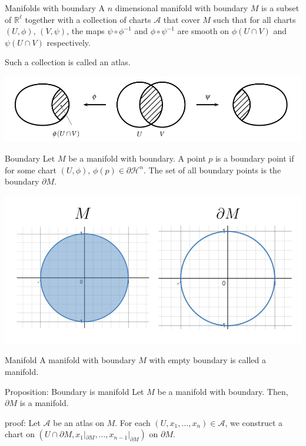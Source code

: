 \documentclass[9pt]{beamer}
\begin{document}
\begin{frame}
    \begin{block}{Manifolds with boundary}
        A $n$ dimensional manifold with boundary $M$ is a subset of $\mathbb{R}^\ell$ together with a collection of charts $\mathcal{A}$ that cover $M$ such that for all charts $(U, \phi)$, $(V, \psi)$, the maps $\psi\circ\phi^{-1}$ and $\phi\circ\psi^{-1}$ are smooth on $\phi(U\cap V)$ and $\psi(U\cap V)$ respectively.

        Such a collection is called an atlas.
    \end{block}
    \includegraphics[scale=0.55]{compatible.PNG}

\end{frame}

\begin{frame}{}
    \begin{block}{Boundary}
        Let $M$ be a manifold with boundary. A point $p$ is a boundary point if for some chart $(U, \phi)$, $\phi(p)\in \partial \mathcal{H}^n$. The set of all boundary points is the boundary $\partial M$.
    \end{block}


\includegraphics[scale=0.6]{boundaryPNG.PNG}

\end{frame}
\begin{frame}
    \begin{block}{Manifold}
        A manifold with boundary $M$ with empty boundary is called a manifold. 
    \end{block}

    \begin{block}{Proposition: Boundary is manifold}
        Let $M$ be a manifold with boundary. Then, $\partial M$ is a manifold.
    \end{block}
    proof: Let $\mathcal{A}$ be an atlas on $M$. For each $(U, x_1, \dots, x_n)\in \mathcal{A}$, we construct a chart on $(U\cap \partial M , x_1|_{\partial M}, \dots, x_{n-1}|_{\partial M})$ on $\partial M$.
\end{frame}
\end{document}
